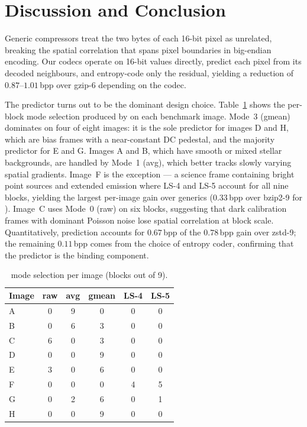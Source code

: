 \section{Discussion and Conclusion}
\label{sec:discussion}

Generic compressors treat the two bytes of each 16-bit pixel as unrelated,
breaking the spatial correlation that spans pixel boundaries in big-endian
encoding. Our codecs operate on 16-bit values directly, predict each pixel
from its decoded neighbours, and entropy-code only the residual, yielding a
reduction of $0.87$--$1.01$\,bpp over gzip-6 depending on the codec.

The predictor turns out to be the dominant design choice. Table~\ref{tab:modes}
shows the per-block mode selection produced by \allrounder{} on each benchmark
image. Mode~3 (gmean) dominates on four of eight images: it is the sole
predictor for images D and H, which are bias frames with a near-constant DC
pedestal, and the majority predictor for E and G. Images A and B, which have
smooth or mixed stellar backgrounds, are handled by Mode~1 (avg), which better
tracks slowly varying spatial gradients. Image~F is the exception --- a science
frame containing bright point sources and extended emission where LS-4 and LS-5
account for all nine blocks, yielding the largest per-image gain over generics
($0.33$\,bpp over bzip2-9 for \allrounder{}). Image~C uses Mode~0 (raw) on six
blocks, suggesting that dark calibration frames with dominant Poisson noise lose
spatial correlation at block scale. Quantitatively, prediction accounts for
$0.67$\,bpp of the $0.78$\,bpp gain over zstd-9; the remaining $0.11$\,bpp
comes from the choice of entropy coder, confirming that the predictor is the
binding component.

\begin{table}[H]
\centering
\caption{\allrounder{} mode selection per image (blocks out of 9).}
\label{tab:modes}
\scriptsize
\begin{tabular}{lccccc}
\toprule
Image & raw & avg & gmean & LS-4 & LS-5 \\
\midrule
A & 0 & 9 & 0 & 0 & 0 \\
B & 0 & 6 & 3 & 0 & 0 \\
C & 6 & 0 & 3 & 0 & 0 \\
D & 0 & 0 & 9 & 0 & 0 \\
E & 3 & 0 & 6 & 0 & 0 \\
F & 0 & 0 & 0 & 4 & 5 \\
G & 0 & 2 & 6 & 0 & 1 \\
H & 0 & 0 & 9 & 0 & 0 \\
\bottomrule
\end{tabular}
\end{table}

